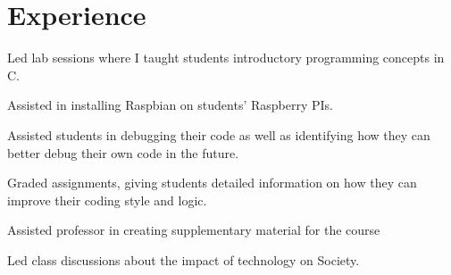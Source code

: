 \documentclass[letterpaper]{deedy-resume} %
\begin{document}
\hfill
%
%
\begin{minipage}[t]{0.74\textwidth} %


\section{Experience}


\vspace{\topsep} %
\begin{tightitemize}
\item Led lab sessions where I taught students introductory programming concepts in C.
\item Assisted in installing Raspbian on students' Raspberry PIs.
\item Assisted students in debugging their code as well as identifying how they can better debug their own code in the future.
\item Graded assignments, giving students detailed information on how they can improve their coding style and logic. 
\end{tightitemize}

\sectionspace %


\begin{tightitemize}
\item Assisted professor in creating supplementary material for the course
\item Led class discussions about the impact of technology on Society.
\end{tightitemize}




\end{minipage}
\end{document}
